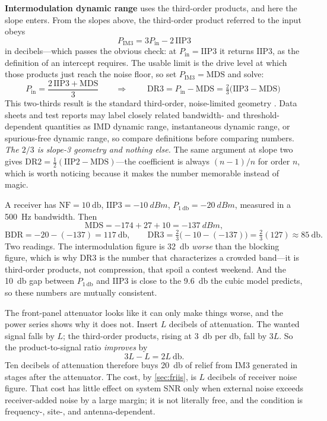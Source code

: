 \textbf{Intermodulation dynamic range} uses the third-order products, and here the
slope enters. From the slopes above, the third-order product referred to the input obeys
\[
P_{\mathrm{IM3}}=3P_{\mathrm{in}}-2\,\mathrm{IIP3}
\]
in decibels---which passes the obvious check: at \(P_{\mathrm{in}}=\mathrm{IIP3}\) it
returns \(\mathrm{IIP3}\), as the definition of an intercept requires. The usable limit
is the drive level at which those products just reach the noise floor, so set
\(P_{\mathrm{IM3}}=\mathrm{MDS}\) and solve:
\[
P_{\mathrm{in}}=\frac{2\,\mathrm{IIP3}+\mathrm{MDS}}{3}
\qquad\Longrightarrow\qquad
\boxed{\;\mathrm{DR3}=P_{\mathrm{in}}-\mathrm{MDS}
=\tfrac{2}{3}\bigl(\mathrm{IIP3}-\mathrm{MDS}\bigr)\;}
\]
This two-thirds result is the standard third-order, noise-limited geometry
\cite[pp.~137--139]{egan2003practical}. Data sheets and test reports may label
closely related bandwidth- and threshold-dependent quantities as IMD dynamic range,
instantaneous dynamic range, or spurious-free dynamic range, so compare definitions
before comparing numbers.
\emph{The \(2/3\) is slope-3 geometry and nothing else.} The same argument at slope two
gives \(\mathrm{DR2}=\tfrac12(\mathrm{IIP2}-\mathrm{MDS})\)---the coefficient is always
\((n-1)/n\) for order \(n\), which is worth noticing because it makes the number
memorable instead of magic.

\begin{workedbox}
A receiver has \(\mathrm{NF}=\SI{10}{\decibel}\),
\(\mathrm{IIP3}=\SI{-10}{dBm}\), \(P_{\SI{1}{\decibel}}=\SI{-20}{dBm}\), measured in a
\SI{500}{\hertz} bandwidth. Then
\[
\mathrm{MDS}=-174+27+10=\SI{-137}{dBm},
\]
\[
\mathrm{BDR}=-20-(-137)=\SI{117}{\decibel},
\qquad
\mathrm{DR3}=\tfrac23\bigl(-10-(-137)\bigr)=\tfrac23(127)\approx\SI{85}{\decibel}.
\]
Two readings. The intermodulation figure is \SI{32}{\decibel} \emph{worse} than the
blocking figure, which is why DR3 is the number that characterizes a crowded band---it
is third-order products, not compression, that spoil a contest weekend. And the
\SI{10}{\decibel} gap between \(P_{\SI{1}{\decibel}}\) and IIP3 is close to the
\SI{9.6}{\decibel} the cubic model predicts, so these numbers are mutually consistent.
\end{workedbox}

\begin{workedbox}
The front-panel attenuator looks like it can only make things worse, and the power
series shows why it does not. Insert \(L\) decibels of attenuation. The wanted signal
falls by \(L\); the third-order products, rising at \SI{3}{\decibel} per \si{\decibel},
fall by \(3L\). So the product-to-signal ratio \emph{improves} by
\[
3L-L=2L\ \si{\decibel} .
\]
Ten decibels of attenuation therefore buys \SI{20}{\decibel} of relief from IM3
generated in stages after the attenuator. The cost, by \cref{sec:friis}, is
\(L\) decibels of receiver noise figure. That cost has little effect on system SNR
only when external noise exceeds receiver-added noise by a large margin; it is not
literally free, and the condition is frequency-, site-, and antenna-dependent.
\end{workedbox}

